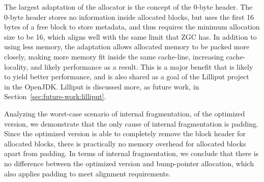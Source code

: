 The largest adaptation of the allocator is the concept of the 0-byte header. The 0-byte header stores no information inside allocated blocks, but uses the first 16 bytes of a free block to store metadata, and thus requires the minimum allocation size to be 16, which aligns well with the same limit that ZGC has. In addition to using less memory, the adaptation allows allocated memory to be packed more closely, making more memory fit inside the same cache-line, increasing cache-locality, and likely performance as a result. This is a major benefit that is likely to yield better performance, and is also shared as a goal of the Lilliput project~\cite{lilliput} in the OpenJDK. Lilliput is discussed more, as future work, in Section~\ref{sec:future-work:lilliput}.

Analyzing the worst-case scenario of internal fragmentation, of the optimized version, we demonstrate that the only cause of internal fragmentation is padding. Since the optimized version is able to completely remove the block header for allocated blocks, there is practically no memory overhead for allocated blocks apart from padding. In terms of internal fragmentation, we conclude that there is no difference between the optimized version and bump-pointer allocation, which also applies padding to meet alignment requirements.


